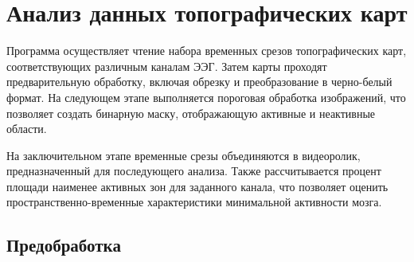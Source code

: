 \chapter{Анализ данных топографических карт}
\label{ch:chap2}
Программа осуществляет чтение набора временных срезов топографических карт, соответствующих различным каналам ЭЭГ. Затем карты проходят предварительную обработку, включая обрезку и преобразование в черно-белый формат. На следующем этапе выполняется пороговая обработка изображений, что позволяет создать бинарную маску, отображающую активные и неактивные области.

На заключительном этапе временные срезы объединяются в видеоролик, предназначенный для последующего анализа. Также рассчитывается процент площади наименее активных зон для заданного канала, что позволяет оценить пространственно-временные характеристики минимальной активности мозга.
\section{Предобработка}

